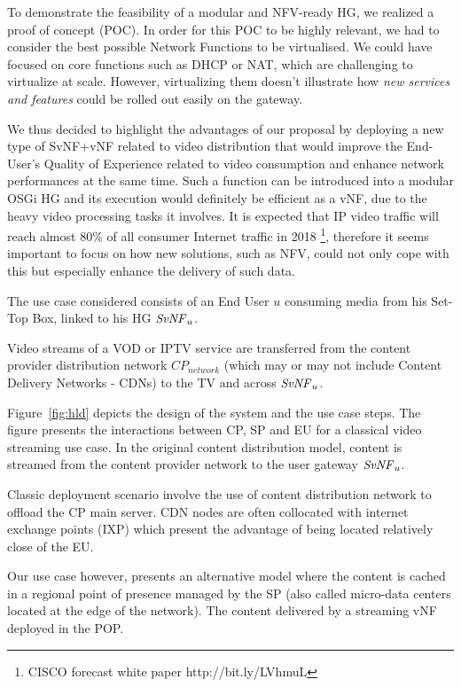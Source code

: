 To demonstrate the feasibility of a modular and NFV-ready HG, we realized a proof of concept (POC).
In order for this POC to be highly relevant, we had to consider the best possible Network Functions to be virtualised.
We could have focused on core functions such as DHCP or NAT, which are challenging to virtualize at scale. However, virtualizing them doesn't illustrate how \textit{new services and features} could be rolled out easily on the gateway.

We thus decided to highlight the advantages of our proposal by deploying a new type of SvNF+vNF related to video distribution that would improve the End-User's Quality of Experience related to video consumption and enhance network performances at the same time.
Such a function can be introduced into a modular OSGi HG and its execution would definitely be efficient as a vNF, due to the heavy video processing tasks it involves.
It is expected that IP video traffic will reach almost 80\% of all consumer Internet traffic in 2018 \footnote{CISCO forecast white paper http://bit.ly/LVhmuL }, therefore it seems important to focus on how new solutions, such as NFV, could not only cope with this but especially enhance the delivery of such data.

The use case considered consists of an End User $u$ consuming media from his Set-Top Box, linked to his HG $\mathit{SvNF}_{u}$.

Video streams of a VOD or IPTV service are transferred from the content provider distribution network \(\mathit{CP}_{\mathit{network}}\) (which may or may not include Content Delivery Networks - CDNs) to the TV and across $\mathit{SvNF}_{u}$.

Figure~\ref{fig:hld} depicts the design of the system and the use case steps. The figure presents the interactions between CP, SP and EU for a classical video streaming use case.
In the original content distribution model, content is streamed from the content provider network  to the user gateway \(\mathit{SvNF}_{u}\).

Classic deployment scenario involve the use of content distribution network to offload the CP main server.
CDN nodes are often collocated with internet exchange points (IXP) which present the advantage of being located relatively close of the EU.

Our use case however, presents an alternative model where the content is cached in a regional point of presence managed by the SP (also called micro-data centers located at the edge of the network). The content delivered by a streaming vNF deployed in the POP.

